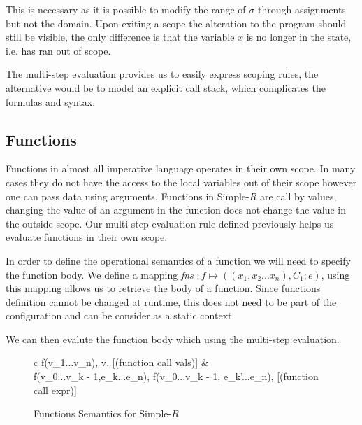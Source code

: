 \documentclass[a4paper,12pt]{report}
\begin{document}
\par
This is necessary as it is possible to modify the range of $\sigma$ through 
assignments but not the domain. Upon exiting a scope the alteration to the program 
should still be visible, the only difference is that the variable $x$ is no longer in 
the state, i.e. has ran out of scope.

\par
The multi-step evaluation provides us to easily express scoping rules, 
the alternative would be to model an explicit call stack, which complicates the 
formulas and syntax.

\subsection{Functions}
Functions in almost all imperative language operates in their own scope. In many 
cases they do not have the access to the local variables out of their scope however 
one can pass data using arguments. Functions in Simple-$R$ are call by values, 
changing the value of an argument in the function does not change the value in 
the outside scope. Our multi-step evaluation rule defined previously helps us 
evaluate functions in their own scope. 

\par
In order to define the operational semantics of a function we will need to 
specify the function body. We define a mapping 
\textit{fns} $: f \mapsto ((x_1, x_2...x_n), C_1;e)$, 
using this mapping allows us to retrieve the body of a function. Since functions 
definition cannot be changed at runtime, this does not need to be part of the 
configuration and can be consider as a static context.

\par
We can then evalute the function body which using the multi-step evaluation.

\begin{figure}[H]
  \begin{center}
    \begin{tabular} {c}
      {\langle f(v_1...v_n), \sigma \rangle \Longrightarrow \langle v, \sigma \rangle} [(function call vals)]
      & \\
      {\langle f(v_0...v_{k - 1},e_k...e_n), \sigma \rangle \Longrightarrow \langle f(v_0...v_{k - 1}, e_{k}'...e_n), \sigma \rangle} [(function call expr)]
    \end{tabular}
  \end{center}
  \caption{Functions Semantics for Simple-$R$}
\end{figure}
\end{document}

